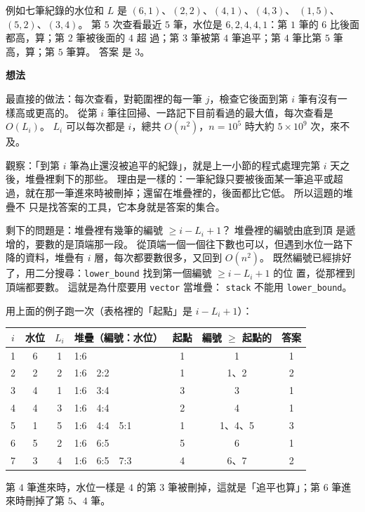 例如七筆紀錄的水位和 $L$ 是 $(6, 1)$、$(2, 2)$、$(4, 1)$、$(4, 3)$、
$(1, 5)$、$(5, 2)$、$(3, 4)$。 第 $5$ 次查看最近 $5$ 筆，水位是
$6, 2, 4, 4, 1$：第 $1$ 筆的 $6$ 比後面都高，算；第 $2$ 筆被後面的 $4$ 超
過；第 $3$ 筆被第 $4$ 筆追平；第 $4$ 筆比第 $5$ 筆高，算；第 $5$ 筆算。 答案
是 $3$。

\textbf{想法}

最直接的做法：每次查看，對範圍裡的每一筆 $j$，檢查它後面到第 $i$ 筆有沒有一
樣高或更高的。 從第 $i$ 筆往回掃、一路記下目前看過的最大值，每次查看是
$O(L_i)$。 $L_i$ 可以每次都是 $i$，總共 $O(n^2)$，$n = 10^5$ 時大約
$5 \times 10^9$ 次，來不及。

觀察：「到第 $i$ 筆為止還沒被追平的紀錄」，就是上一小節的程式處理完第 $i$
天之後，堆疊裡剩下的那些。 理由是一樣的：一筆紀錄只要被後面某一筆追平或超
過，就在那一筆進來時被刪掉；還留在堆疊裡的，後面都比它低。 所以這題的堆疊不
只是找答案的工具，它本身就是答案的集合。

剩下的問題是：堆疊裡有幾筆的編號 $\ge i - L_i + 1$？ 堆疊裡的編號由底到頂
是遞增的，要數的是頂端那一段。 從頂端一個一個往下數也可以，但遇到水位一路下
降的資料，堆疊有 $i$ 層，每次都要數很多，又回到 $O(n^2)$。 既然編號已經排好
了，用二分搜尋：\texttt{lower\_bound} 找到第一個編號 $\ge i - L_i + 1$ 的位
置，從那裡到頂端都要數。 這就是為什麼要用 \texttt{vector} 當堆疊：
\texttt{stack} 不能用 \texttt{lower\_bound}。

用上面的例子跑一次（表格裡的「起點」是 $i - L_i + 1$）：

\begin{center}
\begin{tabular}{ccclccc}
\toprule
$i$ & 水位 & $L_i$ & 堆疊（編號：水位） & 起點 & 編號 $\ge$ 起點的 & 答案 \\
\midrule
1 & 6 & 1 & 1:6 & 1 & 1 & 1 \\
2 & 2 & 2 & 1:6\ \ 2:2 & 1 & 1、2 & 2 \\
3 & 4 & 1 & 1:6\ \ 3:4 & 3 & 3 & 1 \\
4 & 4 & 3 & 1:6\ \ 4:4 & 2 & 4 & 1 \\
5 & 1 & 5 & 1:6\ \ 4:4\ \ 5:1 & 1 & 1、4、5 & 3 \\
6 & 5 & 2 & 1:6\ \ 6:5 & 5 & 6 & 1 \\
7 & 3 & 4 & 1:6\ \ 6:5\ \ 7:3 & 4 & 6、7 & 2 \\
\bottomrule
\end{tabular}
\end{center}

第 $4$ 筆進來時，水位一樣是 $4$ 的第 $3$ 筆被刪掉，這就是「追平也算」；第
$6$ 筆進來時刪掉了第 $5$、$4$ 筆。

